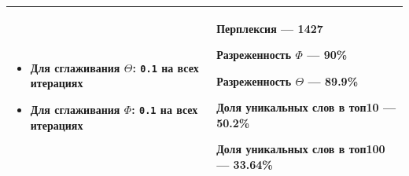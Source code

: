 \begin{tabular}[t]{|p{29em}|p{12em}|}
\begin{itemize}
	                 \verb|        0.016, 0.017, 0.018, 0.019, 0.02,|
	                 
	                 \verb|        0.021, 0.022, 0.024, 0.026, 0.028, |
	                 
	                 \verb|        0.030, 0.034, 0.038, 0.042, 0.046 ]|	   		                              
	     
	\item Для сглаживания $\Theta$: \verb|0.1| на всех итерациях
	
	\item Для сглаживания $\Phi$: \verb|0.1| на всех итерациях	     
	                 
\end{itemize}
&
\vspace{4pt}

Перплексия --- 1427

Разреженность $\Phi$ --- 90\%

Разреженность $\Theta$ --- 89.9\%

Доля уникальных слов в топ10 --- 50.2\%

Доля уникальных слов в топ100 --- 33.64\%

\vspace{4pt}

\\
\hline
\end{tabular}

\vspace{10pt}


